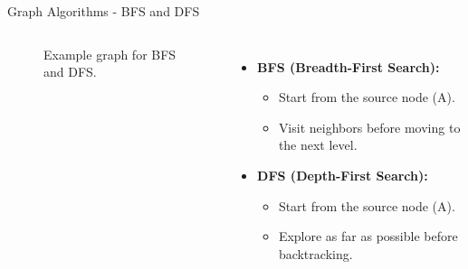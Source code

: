 \documentclass{beamer}
\begin{document}
\begin{frame}{Graph Algorithms - BFS and DFS}
    \begin{columns}
        \begin{figure}
            \caption{Example graph for BFS and DFS.}
        \end{figure}

        \begin{itemize}
            \item \textbf{BFS (Breadth-First Search):}
            \begin{itemize}
                \item Start from the source node (A).
                \item Visit neighbors before moving to the next level.
            \end{itemize}
            \item \textbf{DFS (Depth-First Search):}
            \begin{itemize}
                \item Start from the source node (A).
                \item Explore as far as possible before backtracking.
            \end{itemize}
        \end{itemize}
    \end{columns}
\end{frame}
\end{document}
